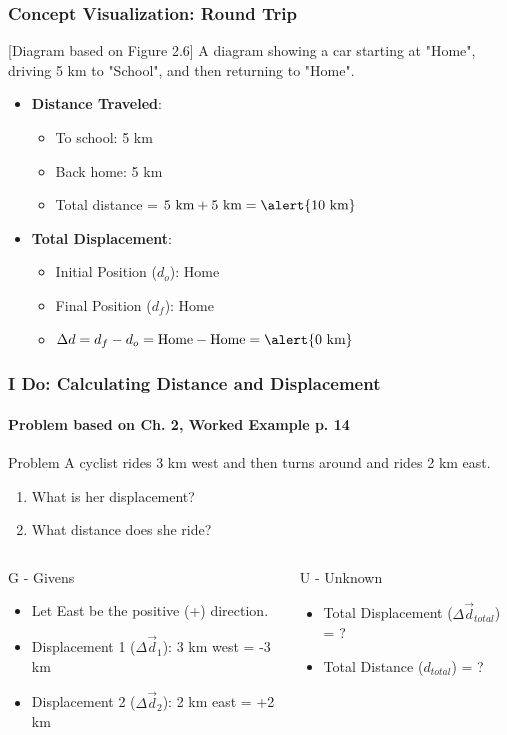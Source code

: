 \documentclass{beamer}
\begin{document}
\begin{frame}
\frametitle{Concept Visualization: Round Trip}
\begin{alertblock}{[Diagram based on Figure 2.6]}
A diagram showing a car starting at "Home", driving 5 km to "School", and then returning to "Home".
\end{alertblock}
\pause
\begin{itemize}
    \item \textbf{Distance Traveled}:
    \begin{itemize}
        \item To school: 5 km
        \item Back home: 5 km
        \item Total distance = $5 \text{ km} + 5 \text{ km} = \alert{10 \text{ km}}$
    \end{itemize}
    \pause
    \item \textbf{Total Displacement}:
    \begin{itemize}
        \item Initial Position ($d_o$): Home
        \item Final Position ($d_f$): Home
        \item $\Delta d = d_f - d_o = \text{Home} - \text{Home} = \alert{0 \text{ km}}$
    \end{itemize}
\end{itemize}
\end{frame}

\begin{frame}
\frametitle{I Do: Calculating Distance and Displacement}
\framesubtitle{Problem based on Ch. 2, Worked Example p. 14}
\begin{block}{Problem}
A cyclist rides 3 km west and then turns around and rides 2 km east.
\begin{enumerate}
    \item What is her displacement?
    \item What distance does she ride?
\end{enumerate}
\end{block}
\pause
\begin{columns}[T]
\begin{block}{G - Givens}
\begin{itemize}
    \item Let East be the positive (+) direction.
    \item Displacement 1 ($\Delta \vec{d}_1$): 3 km west = -3 km
    \item Displacement 2 ($\Delta \vec{d}_2$): 2 km east = +2 km
\end{itemize}
\end{block}
\pause
{}
\begin{block}{U - Unknown}
\begin{itemize}
    \item Total Displacement ($\Delta \vec{d}_{total}$) = ?
    \item Total Distance ($d_{total}$) = ?
\end{itemize}
\end{block}
\end{columns}
\end{frame}
\end{document}

